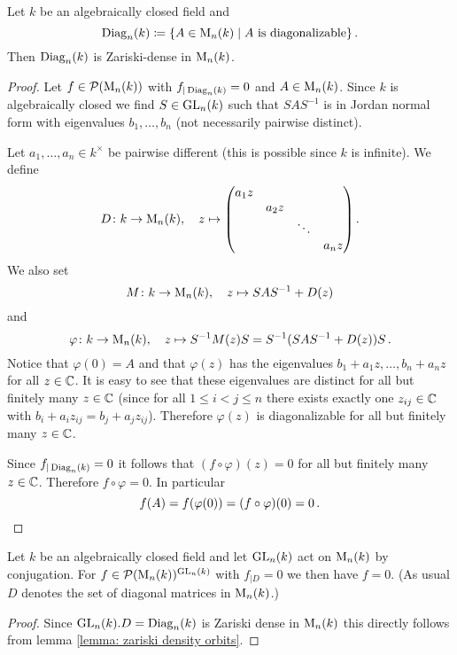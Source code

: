 \begin{proposition}
  Let $k$ be an algebraically closed field and
  \[
              \operatorname{Diag}_n(k)
    \coloneqq \{
                A \in \operatorname{M}_n(k)
              \mid
                \text{$A$ is diagonalizable}
              \} \,.
  \]
  Then $\operatorname{Diag}_n(k)$ is Zariski-dense in $\operatorname{M}_n(k)$.
\end{proposition}
\begin{proof}
  Let $f \in \mathcal{P}(\operatorname{M}_n(k))$ with $f_{|\operatorname{Diag}_n(k)} = 0$ and $A \in \operatorname{M}_n(k)$.
  Since $k$ is algebraically closed we find $S \in \operatorname{GL}_n(k)$ such that $SAS^{-1}$ is in Jordan normal form with eigenvalues $b_1, \dotsc, b_n$ (not necessarily pairwise distinct).
  
  Let $a_1, \dotsc, a_n \in k^\times$ be pairwise different (this is possible since $k$ is infinite).
  We define
  \[
            D
    \colon  k
    \to     \operatorname{M}_n(k), 
    \quad   z
    \mapsto \begin{pmatrix}
              a_1 z &       &        &       \\
                    & a_2 z &        &       \\
                    &       & \ddots &       \\
                    &       &        & a_n z
            \end{pmatrix}.
  \]
  We also set
  \[
            M
    \colon  k
    \to     \operatorname{M}_n(k),
    \quad   z
    \mapsto SAS^{-1} + D(z)
  \]
  and
  \[
            \varphi
    \colon  k
    \to     \operatorname{M}_n(k),
    \quad   z
    \mapsto S^{-1} M(z) S
    =       S^{-1}(SAS^{-1}+D(z))S \,.
  \]
  Notice that $\varphi(0) = A$ and that $\varphi(z)$ has the eigenvalues $b_1 + a_1 z, \dotsc, b_n + a_n z$ for all $z \in \mathbb{C}$.
  It is easy to see that these eigenvalues are distinct for all but finitely many $z \in \mathbb{C}$ (since for all $1 \leq i < j \leq n$ there exists exactly one $z_{ij} \in \mathbb{C}$ with $b_i + a_i z_{ij} = b_j + a_j z_{ij}$).
  Therefore $\varphi(z)$ is diagonalizable for all but finitely many $z \in \mathbb{C}$.
  
  Since $f_{|\operatorname{Diag}_n(k)} = 0$ it follows that $(f \circ \varphi)(z) = 0$ for all but finitely many $z \in \mathbb{C}$.
  Therefore $f \circ \varphi = 0$.
  In particular
  \[
      f(A)
    = f(\varphi(0))
    = (f \circ \varphi)(0)
    = 0 \,.
    \qedhere
  \]
\end{proof}


\begin{corollary}\label{corollary: diagonal matrices dense alg closed}
  Let $k$ be an algebraically closed field and let $\operatorname{GL}_n(k)$ act on $\operatorname{M}_n(k)$ by conjugation.
  For $f \in \mathcal{P}(\operatorname{M}_n(k))^{\operatorname{GL}_n(k)}$ with $f_{|D} = 0$ we then have $f = 0$.
  (As usual $D$ denotes the set of diagonal matrices in $\operatorname{M}_n(k)$.)
\end{corollary}
\begin{proof}
  Since $\operatorname{GL}_n(k).D = \operatorname{Diag}_n(k)$ is Zariski dense in $\operatorname{M}_n(k)$ this directly follows from lemma \ref{lemma: zariski density orbits}.
\end{proof}


